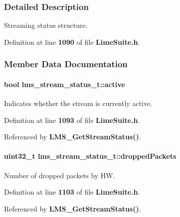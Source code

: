 \subsubsection{Detailed Description}
Streaming status structure. 

Definition at line {\bf 1090} of file {\bf Lime\+Suite.\+h}.



\subsubsection{Member Data Documentation}
\paragraph[{active}]{\setlength{\rightskip}{0pt plus 5cm}bool lms\+\_\+stream\+\_\+status\+\_\+t\+::active}\label{structlms__stream__status__t_a42baa4618667eafdbf01d815c00b0cb1}


Indicates whether the stream is currently active. 



Definition at line {\bf 1093} of file {\bf Lime\+Suite.\+h}.



Referenced by {\bf L\+M\+S\+\_\+\+Get\+Stream\+Status()}.

\paragraph[{dropped\+Packets}]{\setlength{\rightskip}{0pt plus 5cm}uint32\+\_\+t lms\+\_\+stream\+\_\+status\+\_\+t\+::dropped\+Packets}\label{structlms__stream__status__t_a7a750eb3a12a3125066229ccd42e8149}


Number of dropped packets by HW. 



Definition at line {\bf 1103} of file {\bf Lime\+Suite.\+h}.



Referenced by {\bf L\+M\+S\+\_\+\+Get\+Stream\+Status()}.

